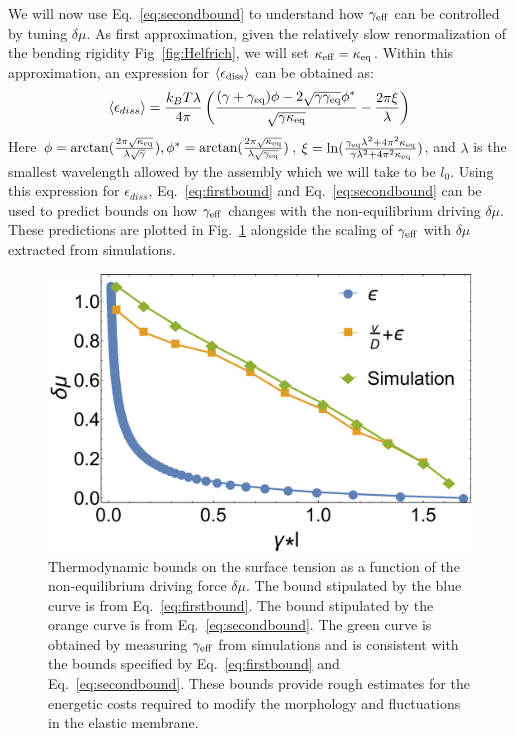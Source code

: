 \documentclass[amsmath,preprintnumbers,10pt,nofootinbib,prl,twocolumn]{revtex4-1}
\begin{document}
We will now use Eq.~\ref{eq:secondbound} to understand how $\gamma_{\rm eff}$ can be controlled by tuning $\delta \mu$. As first approximation, given the relatively slow renormalization of the bending rigidity Fig~\ref{fig:Helfrich}, we will set $\kappa_{\rm eff}=\kappa_{\rm eq}$. Within this approximation, an expression for $\langle\epsilon_{\rm diss}\rangle $ can be obtained as: 
\begin{equation}
\label{eq:epsilonexpress}
 \langle\epsilon_{diss}\rangle =\frac{k_{B}T\lambda}{4\pi}\left ( \frac{(\gamma + \gamma_{\rm eq})\phi-2\sqrt{\gamma\gamma_{\rm eq}}\phi^*}{\sqrt{\gamma \kappa_{\rm eq}}}-\frac{2\pi \xi}{\lambda} \right)
\end{equation}
Here $\phi=\arctan(\frac{2\pi\sqrt{\kappa_{\rm eq}}}{\lambda\sqrt{\gamma}}), \phi^*=\arctan(\frac{2\pi\sqrt{\kappa_{\rm eq}}}{\lambda\sqrt{\gamma_{\rm{eq}}}})$, $\xi=\ln(\frac{\gamma_{\rm{eq}}\lambda^2+4\pi^2\kappa_{\rm eq}}{\gamma\lambda^2+4\pi^2\kappa_{\rm eq}})$, and $\lambda$ is the smallest wavelength allowed by the assembly which we will take to be $l_0$. Using this expression for $\epsilon_{diss}$, Eq.~\ref{eq:firstbound} and Eq.~\ref{eq:secondbound} can be used to predict bounds on how $\gamma_{\rm eff}$ changes with the non-equilibrium driving $\delta \mu$. These predictions are plotted in Fig.~\ref{fig:PhaseDiagram} alongside the scaling of $\gamma_{\rm eff}$ with $\delta \mu$ extracted from simulations. 

\begin{figure}[tbb]
\centering
\includegraphics[scale=0.28]{boundscheckFig6.pdf}
\caption{Thermodynamic bounds on the surface tension as a function of the non-equilibrium driving force $\delta\mu$. The bound stipulated by the blue curve is from Eq.~\ref{eq:firstbound}. The bound stipulated by the orange curve is from Eq.~\ref{eq:secondbound}. The green curve is obtained by measuring $\gamma_{\rm{eff}}$ from simulations and is consistent with the bounds specified by Eq.~\ref{eq:firstbound} and Eq.~\ref{eq:secondbound}. These bounds provide rough estimates for the energetic costs required to modify the morphology and fluctuations in the elastic membrane. }\label{fig:PhaseDiagram}
\end{figure}
\end{document}
